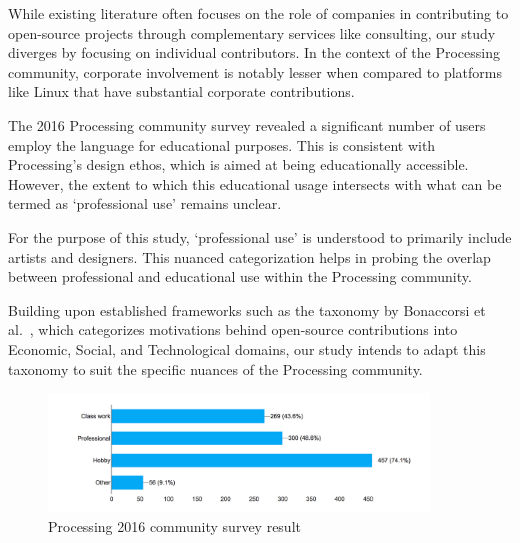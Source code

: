 While existing literature often focuses on the role of companies in contributing to open-source projects through complementary services like consulting, our study diverges by focusing on individual contributors. In the context of the Processing community, corporate involvement is notably lesser when compared to platforms like Linux that have substantial corporate contributions.

The 2016 Processing community survey revealed a significant number of users employ the language for educational purposes. This is consistent with Processing's design ethos, which is aimed at being educationally accessible. However, the extent to which this educational usage intersects with what can be termed as `professional use' remains unclear.

For the purpose of this study, `professional use' is understood to primarily include artists and designers. This nuanced categorization helps in probing the overlap between professional and educational use within the Processing community.

Building upon established frameworks such as the taxonomy by Bonaccorsi et al.~\cite{bonaccorsiComparingMotivationsIndividual2006}, which categorizes motivations behind open-source contributions into Economic, Social, and Technological domains, our study intends to adapt this taxonomy to suit the specific nuances of the Processing community.

\begin{figure}[h!] 
  \centering
  \includegraphics[width=0.9\textwidth]{images/community-survey.png} 
  \caption{Processing 2016 community survey result \parencite{2016CommunitySurvey}}
  \label{fig:community_survey}
\end{figure}




